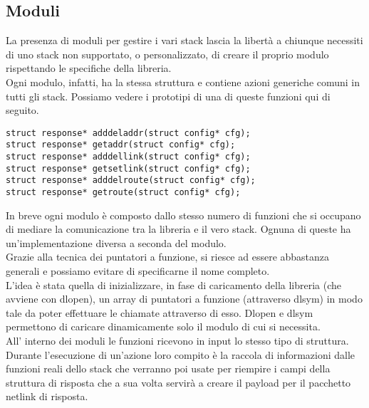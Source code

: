 \subsection{Moduli}
La presenza di moduli per gestire i vari stack lascia la libert\`a a chiunque necessiti di uno stack non supportato, o personalizzato, di creare il proprio modulo rispettando le specifiche della libreria.\\
Ogni modulo, infatti, ha la stessa struttura e contiene azioni generiche comuni in tutti gli stack. Possiamo vedere i prototipi di una di queste funzioni qui di seguito.
\begin{lstlisting}[style=CStyle]
struct response* adddeladdr(struct config* cfg);
struct response* getaddr(struct config* cfg);
struct response* adddellink(struct config* cfg);
struct response* getsetlink(struct config* cfg);
struct response* adddelroute(struct config* cfg);
struct response* getroute(struct config* cfg);
\end{lstlisting}
In breve ogni modulo \`e composto dallo stesso numero di funzioni che si occupano di mediare la comunicazione tra la libreria e il vero stack.
Ognuna di queste ha un'implementazione diversa a seconda del modulo.\\
Grazie alla tecnica dei puntatori a funzione, si riesce ad essere abbastanza generali e possiamo evitare di specificarne il nome completo.\\
L'idea \`e stata quella di inizializzare, in fase di caricamento della libreria (che avviene con dlopen), un array di puntatori a funzione (attraverso dlsym) in modo tale da poter effettuare le chiamate attraverso di esso. Dlopen e dlsym permettono di caricare dinamicamente solo il modulo di cui si necessita.\\
All' interno dei moduli le funzioni ricevono in input lo stesso tipo di struttura. Durante l'esecuzione di un'azione loro compito \`e la raccola di informazioni dalle funzioni reali dello stack che verranno poi usate per riempire i campi della struttura di risposta che a sua volta servir\`a a creare il payload per il pacchetto netlink di risposta.
\clearpage{\pagestyle{empty}\cleardoublepage}
